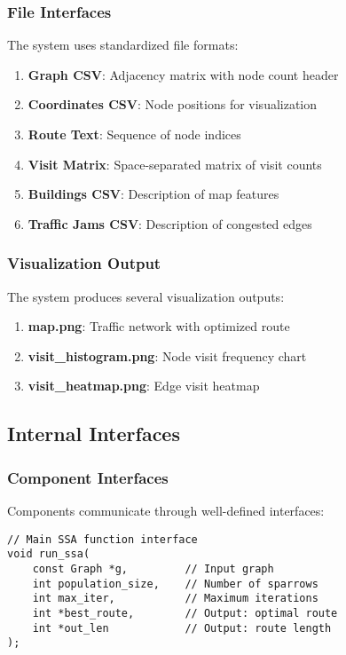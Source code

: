 \documentclass[conference]{IEEEtran}
\begin{document}
\subsubsection{File Interfaces}
The system uses standardized file formats:

\begin{enumerate}
    \item \textbf{Graph CSV}: Adjacency matrix with node count header
    \item \textbf{Coordinates CSV}: Node positions for visualization
    \item \textbf{Route Text}: Sequence of node indices
    \item \textbf{Visit Matrix}: Space-separated matrix of visit counts
    \item \textbf{Buildings CSV}: Description of map features
    \item \textbf{Traffic Jams CSV}: Description of congested edges
\end{enumerate}

\subsubsection{Visualization Output}
The system produces several visualization outputs:

\begin{enumerate}
    \item \textbf{map.png}: Traffic network with optimized route
    \item \textbf{visit\_histogram.png}: Node visit frequency chart
    \item \textbf{visit\_heatmap.png}: Edge visit heatmap
\end{enumerate}

\subsection{Internal Interfaces}

\subsubsection{Component Interfaces}
Components communicate through well-defined interfaces:

\begin{lstlisting}[caption=SSA Core Interface]
// Main SSA function interface
void run_ssa(
    const Graph *g,         // Input graph
    int population_size,    // Number of sparrows
    int max_iter,           // Maximum iterations
    int *best_route,        // Output: optimal route
    int *out_len            // Output: route length
);
\end{lstlisting}
\end{document}
